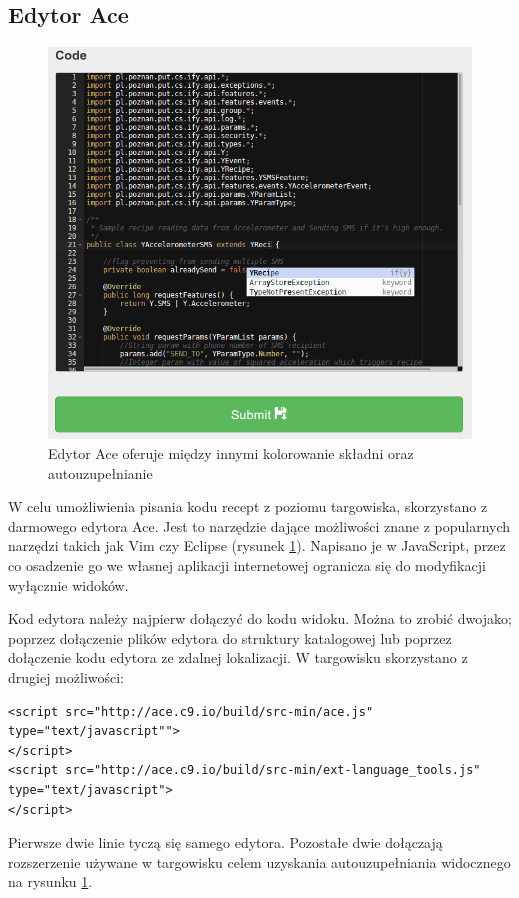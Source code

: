 \documentclass[11pt,a4paper,polish,thesis]{dcsbook}
\begin{document}
\subsection{Edytor Ace}
\begin{figure}[p]
  \centering
  \includegraphics[scale=0.6]{./resources/market_ace.png}
  \caption{Edytor Ace oferuje między innymi kolorowanie składni oraz autouzupełnianie}
  \label{fig:market_ace}
\end{figure}
W celu umożliwienia pisania kodu recept z poziomu targowiska, skorzystano z darmowego edytora Ace. Jest to narzędzie dające możliwości znane z popularnych narzędzi
takich jak Vim czy Eclipse (rysunek \ref{fig:market_ace}). Napisano je w JavaScript, przez co osadzenie go we własnej aplikacji internetowej ogranicza się do
modyfikacji wyłącznie widoków.

Kod edytora należy najpierw dołączyć do kodu widoku. Można to zrobić dwojako; poprzez dołączenie plików edytora do struktury katalogowej lub poprzez dołączenie kodu
edytora ze zdalnej lokalizacji. W targowisku skorzystano z drugiej możliwości:
\begin{verbatim}
<script src="http://ace.c9.io/build/src-min/ace.js" type="text/javascript"">
</script>
<script src="http://ace.c9.io/build/src-min/ext-language_tools.js" type="text/javascript">
</script>
\end{verbatim}
Pierwsze dwie linie tyczą się samego edytora. Pozostałe dwie dołączają rozszerzenie używane w targowisku celem uzyskania autouzupełniania widocznego na
rysunku \ref{fig:market_ace}.
\end{document}

